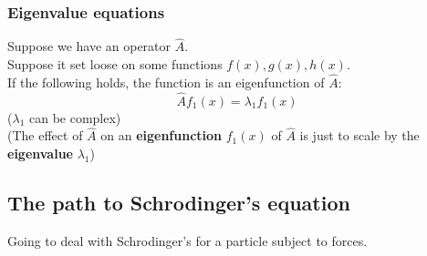 \documentclass{article}
\begin{document}
\subsubsection{Eigenvalue equations}
Suppose we have an operator $\hat{A}$.\\
Suppose it set loose on some functions $f(x), g(x), h(x)$. \\
If the following holds, the function is an eigenfunction of $\hat{A}$:
$$ \hat{A}f_1(x) = \lambda_1 f_1(x) $$
($\lambda_1$ can be complex)\\
(The effect of $\hat{A}$ on an \textbf{eigenfunction} $f_1(x)$ of $\hat{A}$ is just to scale by the \textbf{eigenvalue} $\lambda_1$) \\

\subsection{The path to Schrodinger's equation}
Going to deal with Schrodinger's for a particle subject to forces.\\
\end{document}
